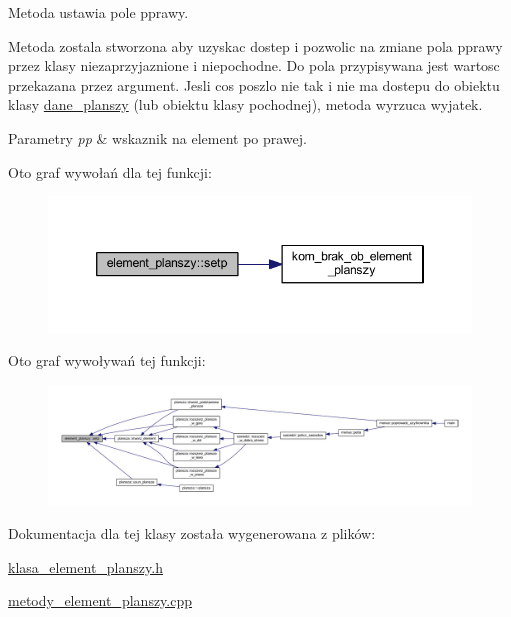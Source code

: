 Metoda ustawia pole pprawy.

Metoda zostala stworzona aby uzyskac dostep i pozwolic na zmiane pola pprawy przez klasy niezaprzyjaznione i niepochodne. Do pola przypisywana jest wartosc przekazana przez argument. Jesli cos poszlo nie tak i nie ma dostepu do obiektu klasy \mbox{\hyperlink{classdane__planszy}{dane\+\_\+planszy}} (lub obiektu klasy pochodnej), metoda wyrzuca wyjatek. 
\begin{DoxyParams}{Parametry}
{\em pp} & wskaznik na element po prawej. \\
\hline
\end{DoxyParams}
Oto graf wywołań dla tej funkcji\+:
\nopagebreak
\begin{figure}[H]
\begin{center}
\leavevmode
\includegraphics[width=346pt]{classelement__planszy_a38094d3cf8ce3543fa3e0720f30583e9_cgraph}
\end{center}
\end{figure}
Oto graf wywoływań tej funkcji\+:
\nopagebreak
\begin{figure}[H]
\begin{center}
\leavevmode
\includegraphics[width=350pt]{classelement__planszy_a38094d3cf8ce3543fa3e0720f30583e9_icgraph}
\end{center}
\end{figure}


Dokumentacja dla tej klasy została wygenerowana z plików\+:\begin{DoxyCompactItemize}
\item 
\mbox{\hyperlink{klasa__element__planszy_8h}{klasa\+\_\+element\+\_\+planszy.\+h}}\item 
\mbox{\hyperlink{metody__element__planszy_8cpp}{metody\+\_\+element\+\_\+planszy.\+cpp}}\end{DoxyCompactItemize}

